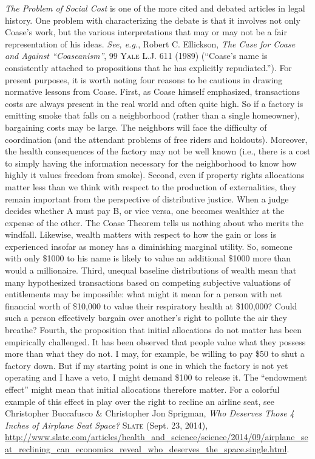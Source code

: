 \textit{The Problem of Social Cost} is one of the more cited and debated
articles in legal history. One problem with characterizing the debate is that it
involves not only Coase's work, but the various interpretations that may or may
not be a fair representation of his ideas. \textit{See, e.g.}, Robert C.
Ellickson, \textit{The Case for Coase and Against ``Coaseanism''}, 99
\textsc{Yale L.J}. 611 (1989) (``Coase's name is consistently attached to
propositions that he has explicitly repudiated.''). For present purposes, it is
worth noting four reasons to be cautious in drawing normative lessons from
Coase. First, as Coase himself emphasized, transactions costs are always present
in the real world and often quite high. So if a factory is emitting smoke that
falls on a neighborhood (rather than a single homeowner), bargaining costs may
be large. The neighbors will face the difficulty of coordination (and the
attendant problems of free riders and holdouts). Moreover, the health
consequences of the factory may not be well known (i.e., there is a cost to
simply having the information necessary for the neighborhood to know how highly
it values freedom from smoke). Second, even if property rights allocations
matter less than we think with respect to the production of externalities, they
remain important from the perspective of distributive justice. When a judge
decides whether A must pay B, or vice versa, one becomes wealthier at the
expense of the other. The Coase Theorem tells us nothing about who merits the
windfall. Likewise, wealth matters with respect to how the gain or loss is
experienced insofar as money has a diminishing marginal utility. So, someone
with only \$1000 to his name is likely to value an additional \$1000 more than
would a millionaire. Third, unequal baseline distributions of wealth mean that
many hypothesized transactions based on competing subjective valuations of
entitlements may be impossible: what might it mean for a person with net
financial worth of \$10,000 to value their respiratory health at \$100,000?
Could such a person effectively bargain over another's right to pollute the air
they breathe? Fourth, the proposition that initial allocations do not matter has
been empirically challenged. It has been observed that people value what they
possess more than what they do not. I may, for example, be willing to pay \$50
to shut a factory down. But if my starting point is one in which the factory is
not yet operating and I have a veto, I might demand \$100 to release it. The
``endowment effect'' might mean that initial allocations therefore matter. For a
colorful example of this effect in play over the right to recline an airline
seat, see Christopher Buccafusco \& Christopher Jon Sprigman, \textit{Who
Deserves Those 4 Inches of Airplane Seat Space?} \textsc{Slate} (Sept. 23,
2014),
\url{http://www.slate.com/articles/health_and_science/science/2014/09/airplane_seat_reclining_can_economics_reveal_who_deserves_the_space.single.html}.


